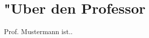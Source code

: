 \documentclass[emulatestandardclasses]{scrartcl}
\begin{document}
\newpage
\section{"Uber den Professor}
Prof. Mustermann ist..


\end{document}
